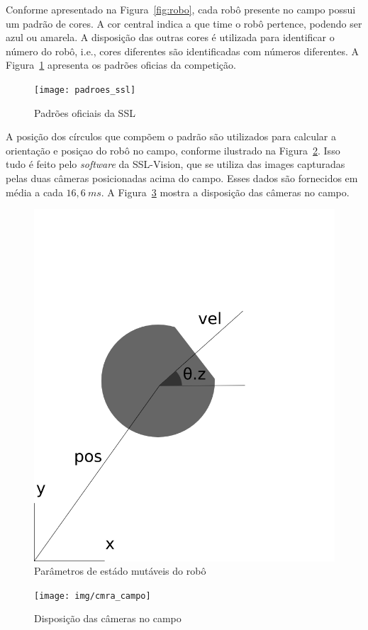 Conforme apresentado na Figura~\ref{fig:robo}, cada robô presente no campo
possui um padrão de cores.  A cor central indica a que time o robô pertence,
podendo ser azul ou amarela.  A disposição das outras cores é utilizada para
identificar o número do robô, i.e., cores diferentes são identificadas com
números diferentes.  A Figura~\ref{fig:padroes_ssl} apresenta os padrões oficias
da competição.

\begin{figure}[thpb]
  \centering
  \texttt{[image: padroes\_ssl]}
  \caption{Padrões oficiais da SSL~\cite{zickler-ssl}}\label{fig:padroes_ssl}
\end{figure}

A posição dos círculos que compõem o padrão são utilizados para calcular a
orientação e posiçao do robô no campo, conforme ilustrado na
Figura~\ref{fig:rob_data}.  Isso tudo é feito pelo \textit{software} da
SSL-Vision, que se utiliza das images capturadas pelas duas câmeras posicionadas
acima do campo.  Esses dados são fornecidos em média a cada $16,6{\ }ms$.  A
Figura~\ref{fig:cmra_campo} mostra a disposição das câmeras no campo.

\begin{figure}[thpb]
  \centering
  \includegraphics[width=0.5\linewidth]{img/rob_data}
  \caption{Parâmetros de estádo mutáveis do robô}\label{fig:rob_data}
\end{figure}

\begin{figure}[thpb]
  \centering
  \texttt{[image: img/cmra\_campo]}
  \caption{Disposição das câmeras no campo}\label{fig:cmra_campo}
\end{figure}

